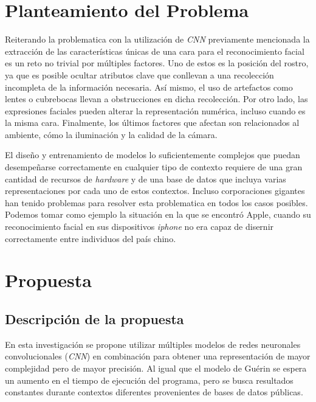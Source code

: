 \documentclass[letterpaper, 10 pt, conference]{ieeeconf}  %
\begin{document}
    \section{Planteamiento del Problema}
    Reiterando la problematica con la utilización de \textit{CNN} previamente mencionada
    la extracción de las características únicas de una cara para el reconocimiento facial
    es un reto no trivial por múltiples factores. Uno de estos es la posición del rostro,
    ya que es posible ocultar atributos clave que conllevan a una recolección incompleta
    de la información necesaria. Así mismo, el uso de artefactos como lentes o cubrebocas
    llevan a obstrucciones en dicha recolección. Por otro lado, las expresiones faciales
    pueden alterar la representación numérica, incluso cuando es la misma cara. Finalmente,
    los últimos factores que afectan son relacionados al ambiente, cómo la iluminación
    y la calidad de la cámara. \cite{Bodini2019}

    El diseño y entrenamiento de modelos lo suficientemente complejos que puedan desempeñarse
    correctamente en cualquier tipo de contexto requiere de una gran cantidad de recursos de
    \textit{hardware} y de una base de datos que incluya varias representaciones por cada uno
    de estos contextos. Incluso corporaciones gigantes han tenido problemas para resolver esta
    problematica en todos los casos posibles. Podemos tomar como ejemplo la situación en la que
    se encontró Apple, cuando su reconocimiento facial en sus dispositivos \textit{iphone} no
    era capaz de disernir correctamente entre individuos del país chino. \cite{Birchall2017}


    \section{Propuesta}

    \subsection{Descripción de la propuesta}
    En esta investigación se propone utilizar múltiples modelos de redes neuronales convolucionales
    (\textit{CNN}) en combinación para obtener una representación de mayor complejidad pero de
    mayor precisión. Al igual que el modelo de Guérin \cite{CombiningCNN} se espera un aumento 
    en el tiempo de ejecución del programa, pero se busca resultados constantes durante contextos
    diferentes provenientes de bases de datos públicas.
\end{document}
